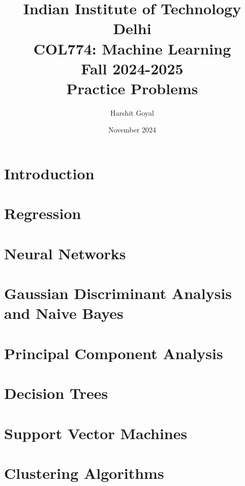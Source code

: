 \documentclass{article}
\title{Indian Institute of Technology Delhi\\COL774: Machine Learning\\Fall 2024-2025\\Practice Problems}
\author{Harshit Goyal}
\date{November 2024}
\begin{document}
\maketitle



\tableofcontents
\section{Introduction}\label{intro}

\newpage
\section{Regression}









\newpage
\section{Neural Networks}



\newpage
\section{Gaussian Discriminant Analysis and Naive Bayes}\label{sec:gda}


\newpage
\section{Principal Component Analysis}

\section{Decision Trees}

\section{Support Vector Machines}

\section{Clustering Algorithms}

\newpage
\nocite{*}


\end{document}
